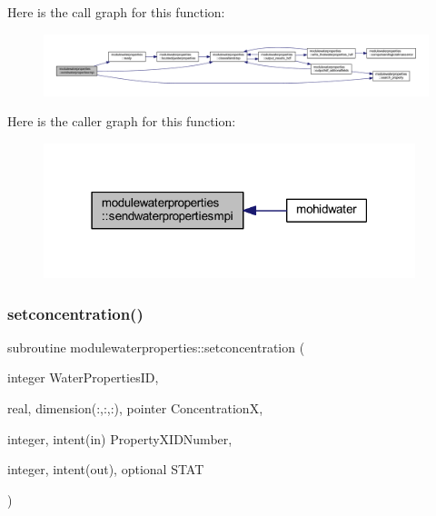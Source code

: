 Here is the call graph for this function\+:\nopagebreak
\begin{figure}[H]
\begin{center}
\leavevmode
\includegraphics[width=350pt]{namespacemodulewaterproperties_a06e60ba3cd186c1e0cc2c534f1148b41_cgraph}
\end{center}
\end{figure}
Here is the caller graph for this function\+:\nopagebreak
\begin{figure}[H]
\begin{center}
\leavevmode
\includegraphics[width=307pt]{namespacemodulewaterproperties_a06e60ba3cd186c1e0cc2c534f1148b41_icgraph}
\end{center}
\end{figure}
\mbox{\label{namespacemodulewaterproperties_aea5dfa662931ed10a0e9543a5150c9b5}} 
\subsubsection{\texorpdfstring{setconcentration()}{setconcentration()}}
{\footnotesize\ttfamily subroutine modulewaterproperties\+::setconcentration (\begin{DoxyParamCaption}\item[{integer}]{Water\+Properties\+ID,  }\item[{real, dimension(\+:,\+:,\+:), pointer}]{ConcentrationX,  }\item[{integer, intent(in)}]{Property\+X\+I\+D\+Number,  }\item[{integer, intent(out), optional}]{S\+T\+AT }\end{DoxyParamCaption})\hspace{0.3cm}{\ttfamily [private]}}


